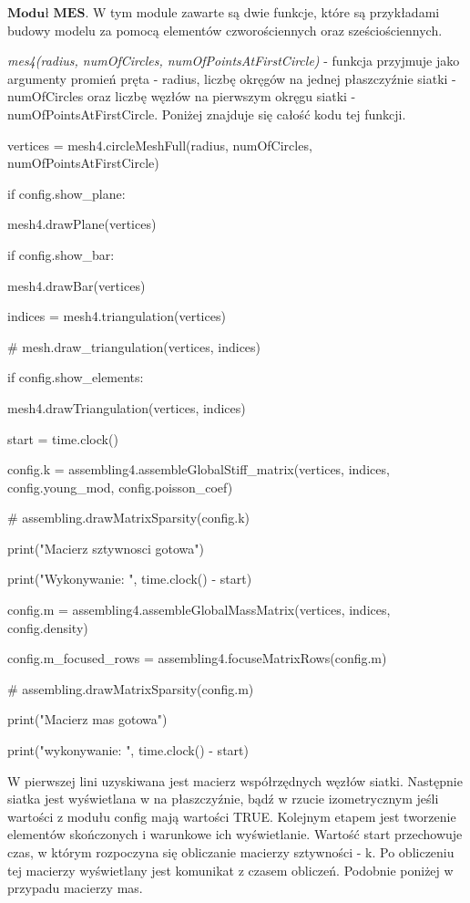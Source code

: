  \( \textbf{Moduł MES} \).
W tym module zawarte są dwie funkcje, które są przykładami budowy modelu za pomocą elementów czworościennych oraz sześciościennych.

\textit{mes4(radius, numOfCircles, numOfPointsAtFirstCircle)} - funkcja przyjmuje jako argumenty promień pręta - radius, liczbę okręgów na jednej płaszczyźnie siatki - numOfCircles oraz liczbę węzłów na pierwszym okręgu siatki - numOfPointsAtFirstCircle. Poniżej znajduje się całość kodu tej funkcji.

\vspace {3mm}

    vertices = mesh4.circleMeshFull(radius, numOfCircles, numOfPointsAtFirstCircle)

    if config.show\_plane:

        mesh4.drawPlane(vertices)

    if config.show\_bar:

        mesh4.drawBar(vertices)

\vspace {3mm}
    indices = mesh4.triangulation(vertices)

    \# mesh.draw\_triangulation(vertices, indices)

    if config.show\_elements:

        mesh4.drawTriangulation(vertices, indices)

\vspace {3mm}
    start = time.clock()

    config.k = assembling4.assembleGlobalStiff\_matrix(vertices, indices, config.young\_mod, config.poisson\_coef)

    \# assembling.drawMatrixSparsity(config.k)

    print("Macierz sztywnosci gotowa")

    print("Wykonywanie: ", time.clock() - start)

\vspace {3mm}
    config.m = assembling4.assembleGlobalMassMatrix(vertices, indices, config.density)

    config.m\_focused\_rows = assembling4.focuseMatrixRows(config.m)

    \# assembling.drawMatrixSparsity(config.m)

    print("Macierz mas gotowa")

    print("wykonywanie: ", time.clock() - start)

\vspace {3mm}

W pierwszej lini uzyskiwana jest macierz współrzędnych węzłów siatki. Następnie siatka jest wyświetlana w na płaszczyźnie, bądź w rzucie izometrycznym jeśli wartości z modułu config mają wartości TRUE. Kolejnym etapem jest tworzenie elementów skończonych i warunkowe ich wyświetlanie. Wartość start przechowuje czas, w którym rozpoczyna się obliczanie macierzy sztywności - k. Po obliczeniu tej macierzy wyświetlany jest komunikat z czasem obliczeń.  Podobnie poniżej w przypadu macierzy mas.

